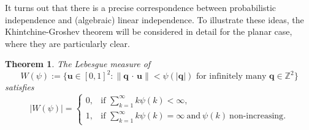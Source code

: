 \documentclass[reqno]{amsart}
\newtheorem{thm}{Theorem}
\newcommand{\Z}{{\mathbb{Z}}}
\newcommand{\0}{{\mathbf{0}}}
\newcommand{\q}{{\mathbf{q}}}
\newcommand{\ub}{\mathbf{u}}
\newcommand{\ip}{\,{\cdot}\,}
\newcommand{\KG}{Khintchine-Groshev}
\begin{document}
It turns out that there is a precise correspondence between
probabilistic independence and (algebraic) linear independence.  To
illustrate these ideas, the \KG{} theorem will be 
considered in detail
 for the planar case, where they are particularly clear.
\begin{thm} 
  The Lebesgue measure of 
  \begin{equation*}
    W(\psi):=\{\ub\in [0,1]^2\colon \|\q\ip\ub\|<\psi(|\q|) 
\text{ for infinitely many } \q\in\Z^2\}
  \end{equation*}
 satisfies
  \begin{equation*}
    |W(\psi)| = \begin{cases} 0, 
           &\text{if } \sum_{k=1}^\infty k\psi(k)<\infty, \\
1,
          &\text{if }  \sum_{k=1}^\infty k\psi(k)=\infty 
\ \text{and}\ \psi(k) \ \text{non-increasing}.
                  \end{cases}
  \end{equation*}
\end{thm}
\end{document}
